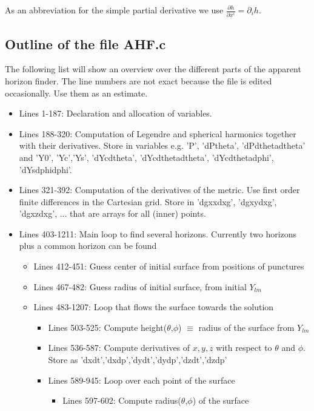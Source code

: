 \documentclass[11pt,a4paper,twoside]{article}
\begin{document}
As an abbreviation for the simple partial derivative we use 
$\frac {\partial h} {\partial x^i} = \partial_i h$.

\subsection{Outline of the file AHF.c}
The following list will show an overview over the different parts
of the apparent horizon finder. The line numbers are not exact because
the file is edited occasionally. Use them as an estimate.
\begin{itemize}
  \item {Lines 1-187:} Declaration and allocation of variables.
  \item {Lines 188-320:} Computation of Legendre and spherical harmonics
    together with their derivatives. Store in variables e.g. 'P', 
    'dPtheta', 'dPdthetadtheta' and 'Y0', 'Yc','Ys', 'dYcdtheta', 
    'dYcdthetadtheta', 'dYcdthetadphi', 'dYsdphidphi'.
  \item {Lines 321-392:} Computation of the derivatives of the metric.
    Use first order finite differences in the Cartesian grid. Store in
    'dgxxdxg', 'dgxydxg', 'dgxzdxg', ... that are arrays for all (inner) points.
  \item {Lines 403-1211:} Main loop to find several horizons. Currently
   two horizons plus a common horizon can be found
  \begin{itemize}
    \item {Lines 412-451:} Guess center of initial surface from positions 
                           of punctures
    \item {Lines 467-482:} Guess radius of initial surface, from initial $Y_{lm}$
    \item {Lines 483-1207:} Loop that flows the surface towards the solution
    \begin{itemize}
      \item {Lines 503-525:} Compute height($\theta$,$\phi$) $\equiv$ radius 
                            of the surface from $Y_{lm}$
      \item {Lines 536-587:}  Compute derivatives of $x,y,z$ with respect to
        $\theta$ and $\phi$. Store as 'dxdt','dxdp','dydt','dydp','dzdt','dzdp'
      \item {Lines 589-945:} Loop over each point of the surface
      \begin{itemize}
        \item {Lines 597-602:} Compute radius($\theta$,$\phi$) of the surface 

\end{itemize}
\end{itemize}
\end{itemize}
\end{itemize}
\end{document}

